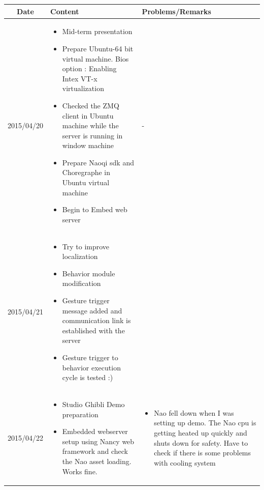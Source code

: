 \documentclass[11pt]{article} %
\begin{document}
\begin{center}
    \begin{longtable}{ | c | p{6cm} | p{5cm} |}
    \hline
    Date & Content & Problems/Remarks \\ 
    \endhead
    \hline    
     2015/04/20         & 
  \begin{itemize}
  \item Mid-term presentation
  \item Prepare Ubuntu-64 bit virtual machine. Bios option : Enabling Intex VT-x virtualization
  \item Checked the ZMQ client in Ubuntu machine while the server is running in window machine
  \item Prepare Naoqi sdk and Choregraphe in Ubuntu virtual machine
  \item Begin to Embed web server
\end{itemize}  
   & - \\
\hline
  										 
 2015/04/21         & 
  \begin{itemize}
  \item Try to improve localization
  \item Behavior module modification
  \item Gesture trigger message added and communication link is established with the server
  \item Gesture trigger to behavior execution cycle is tested :)
\end{itemize}   
& 
 \\
\hline
  										 
  
  2015/04/22        & 
  \begin{itemize}
  \item Studio Ghibli Demo preparation
  \item Embedded webserver setup using Nancy web framework and check the Nao asset loading. Works fine.
  \end{itemize}   
  										 & 
  \begin{itemize}
  \item Nao fell down when I was setting up demo. The Nao cpu is getting heated up quickly and shuts down for safety. Have to check if there is some problems with cooling system
  \end{itemize}
  										 \\
  \hline
  

\end{longtable}
\end{center}
\end{document}
